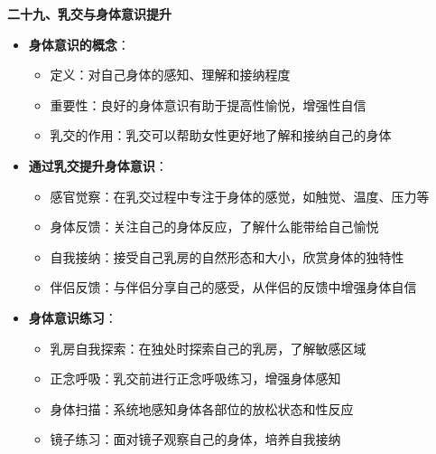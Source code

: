 \documentclass[12pt,UTF8]{ctexbook}
\begin{document}
  \textbf{二十九、乳交与身体意识提升}
  \begin{itemize}
  \item \textbf{身体意识的概念}：
    \begin{itemize}
    \item 定义：对自己身体的感知、理解和接纳程度
    \item 重要性：良好的身体意识有助于提高性愉悦，增强性自信
    \item 乳交的作用：乳交可以帮助女性更好地了解和接纳自己的身体
    \end{itemize}
  \item \textbf{通过乳交提升身体意识}：
    \begin{itemize}
    \item 感官觉察：在乳交过程中专注于身体的感觉，如触觉、温度、压力等
    \item 身体反馈：关注自己的身体反应，了解什么能带给自己愉悦
    \item 自我接纳：接受自己乳房的自然形态和大小，欣赏身体的独特性
    \item 伴侣反馈：与伴侣分享自己的感受，从伴侣的反馈中增强身体自信
    \end{itemize}
  \item \textbf{身体意识练习}：
    \begin{itemize}
    \item 乳房自我探索：在独处时探索自己的乳房，了解敏感区域
    \item 正念呼吸：乳交前进行正念呼吸练习，增强身体感知
    \item 身体扫描：系统地感知身体各部位的放松状态和性反应
    \item 镜子练习：面对镜子观察自己的身体，培养自我接纳
    \end{itemize}
  \end{itemize}
\end{document}
